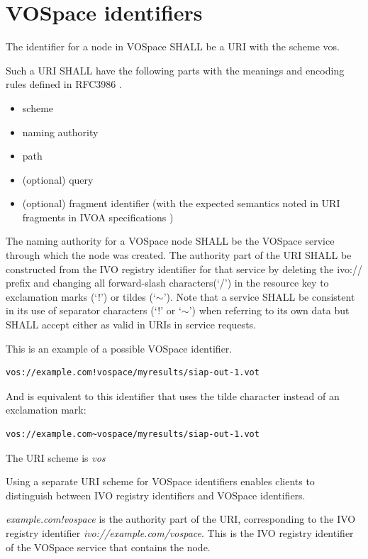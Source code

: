 \documentclass[11pt,a4paper]{ivoa}
\begin{document}
\section{VOSpace identifiers}
\label{sec:vospace identifiers}
The identifier for a node in VOSpace SHALL be a URI with the scheme vos.

Such a URI SHALL have the following parts with the meanings and encoding rules defined in RFC3986 \citep{std:RFC3986}.

\begin{itemize}
  \item scheme
  \item naming authority
  \item path
  \item (optional) query
  \item (optional) fragment identifier (with the expected semantics noted in URI fragments in IVOA specifications \citep{note:uriforms})
\end{itemize}

The naming authority for a VOSpace node SHALL be the VOSpace service through which the node was created. The authority part of the URI SHALL be constructed from the IVO registry identifier \citep{std:VOID} for that service by deleting the ivo:// prefix and changing all forward-slash characters(`/') in the resource key to exclamation marks (`!') or tildes (`$\mathtt{\sim}$'). Note that a service SHALL be consistent in its use of separator characters (`!' or `$\mathtt{\sim}$') when referring to its own data but SHALL accept either as valid in URIs in service requests.

This is an example of a possible VOSpace identifier.

\begin{verbatim}
vos://example.com!vospace/myresults/siap-out-1.vot
\end{verbatim}

And is equivalent to this identifier that uses the tilde character instead of an exclamation mark:

\begin{verbatim}
vos://example.com~vospace/myresults/siap-out-1.vot
\end{verbatim}

The URI scheme is \emph{vos}

Using a separate URI scheme for VOSpace identifiers enables clients to distinguish between IVO registry identifiers and VOSpace identifiers.

\emph{example.com!vospace} is the authority part of the URI, corresponding to the IVO registry identifier \emph{ivo://example.com/vospace}.  This is the IVO registry identifier of the VOSpace service that contains the node.
\end{document}
